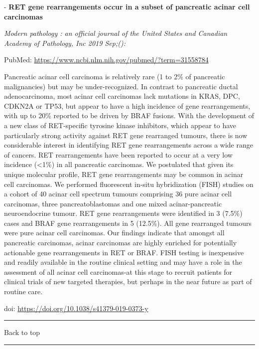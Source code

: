 \documentclass[
]{article}
\renewcommand{\linethickness}{0.05em}
\begin{document}
- \textbf{RET gene rearrangements occur in a subset of pancreatic acinar
cell carcinomas}

\emph{Modern pathology : an official journal of the United States and
Canadian Academy of Pathology, Inc 2019 Sep;():}

PubMed: \url{https://www.ncbi.nlm.nih.gov/pubmed/?term=31558784}

Pancreatic acinar cell carcinoma is relatively rare (1 to 2\% of
pancreatic malignancies) but may be under-recognized. In contrast to
pancreatic ductal adenocarcinoma, most acinar cell carcinomas lack
mutations in KRAS, DPC, CDKN2A or TP53, but appear to have a high
incidence of gene rearrangements, with up to 20\% reported to be driven
by BRAF fusions. With the development of a new class of RET-specific
tyrosine kinase inhibitors, which appear to have particularly strong
activity against RET gene rearranged tumours, there is now considerable
interest in identifying RET gene rearrangements across a wide range of
cancers. RET rearrangements have been reported to occur at a very low
incidence (\textless1\%) in all pancreatic carcinomas. We postulated
that given its unique molecular profile, RET gene rearrangements may be
common in acinar cell carcinomas. We performed fluorescent in-situ
hybridization (FISH) studies on a cohort of 40 acinar cell spectrum
tumours comprising 36 pure acinar cell carcinomas, three
pancreatoblastomas and one mixed acinar-pancreatic neuroendocrine
tumour. RET gene rearrangements were identified in 3 (7.5\%) cases and
BRAF gene rearrangements in 5 (12.5\%). All gene rearranged tumours were
pure acinar cell carcinomas. Our findings indicate that amongst all
pancreatic carcinomas, acinar carcinomas are highly enriched for
potentially actionable gene rearrangements in RET or BRAF. FISH testing
is inexpensive and readily available in the routine clinical setting and
may have a role in the assessment of all acinar cell carcinomas-at this
stage to recruit patients for clinical trials of new targeted therapies,
but perhaps in the near future as part of routine care.

doi: \url{https://doi.org/10.1038/s41379-019-0373-y}

\begin{center}\rule{0.5\linewidth}{\linethickness}\end{center}

Back to top

\begin{center}\rule{0.5\linewidth}{\linethickness}\end{center}
\end{document}
